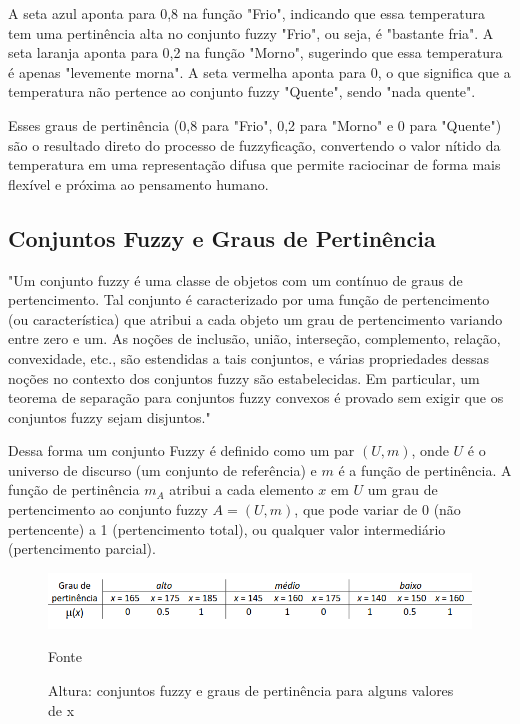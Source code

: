 \documentclass[12pt]{article}
\begin{document}
    A seta azul aponta para 0,8 na função "Frio", indicando que essa temperatura tem uma pertinência alta no conjunto fuzzy "Frio", ou seja, é "bastante fria".
    A seta laranja aponta para 0,2 na função "Morno", sugerindo que essa temperatura é apenas "levemente morna".
    A seta vermelha aponta para 0, o que significa que a temperatura não pertence ao conjunto fuzzy "Quente", sendo "nada quente".

Esses graus de pertinência (0,8 para "Frio", 0,2 para "Morno" e 0 para "Quente") são o resultado direto do processo de fuzzyficação, convertendo o valor nítido da temperatura em uma representação difusa que permite raciocinar de forma mais flexível e próxima ao pensamento humano.

\subsection{Conjuntos Fuzzy e Graus de Pertinência}

"Um conjunto fuzzy é uma classe de objetos com um contínuo de graus de pertencimento. Tal conjunto é caracterizado por uma função de pertencimento (ou característica) que atribui a cada objeto um grau de pertencimento variando entre zero e um. As noções de inclusão, união, interseção, complemento, relação, convexidade, etc., são estendidas a tais conjuntos, e várias propriedades dessas noções no contexto dos conjuntos fuzzy são estabelecidas. Em particular, um teorema de separação para conjuntos fuzzy convexos é provado sem exigir que os conjuntos fuzzy sejam disjuntos."\cite{ZADEH1965338}

Dessa forma um conjunto Fuzzy é definido como um par $(U, m)$, onde $U$ é o universo de discurso (um conjunto de referência) e $m$ é a função de pertinência. A função de pertinência $m_A$ atribui a cada elemento $x$ em $U$ um grau de pertencimento ao conjunto fuzzy $A = (U, m)$, que pode variar de 0 (não pertencente) a 1 (pertencimento total), ou qualquer valor intermediário (pertencimento parcial).

\begin{figure}[ht]
\centering
\includegraphics[width=.9\textwidth]{ConjFuzzy.png}
\caption{Altura: conjuntos fuzzy e graus de pertinência para alguns valores de x}
{\footnotesize Fonte \cite{ConceitFuzzy}}
\label{fig:fig3}
\end{figure}
\end{document}
